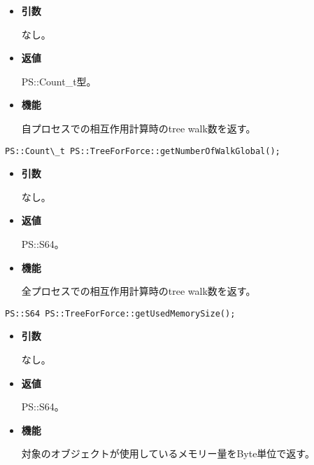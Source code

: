 \begin{itemize}

\item {\bf 引数}

なし。

\item {\bf 返値}

PS::Count\_t型。

\item {\bf 機能}

自プロセスでの相互作用計算時のtree walk数を返す。

\end{itemize}

\begin{screen}
\begin{verbatim}
PS::Count\_t PS::TreeForForce::getNumberOfWalkGlobal();
\end{verbatim}
\end{screen}

\begin{itemize}

\item {\bf 引数}

なし。

\item {\bf 返値}

PS::S64。

\item {\bf 機能}

全プロセスでの相互作用計算時のtree walk数を返す。

\end{itemize}

\begin{screen}
\begin{verbatim}
PS::S64 PS::TreeForForce::getUsedMemorySize();
\end{verbatim}
\end{screen}

\begin{itemize}

\item {\bf 引数}

なし。

\item {\bf 返値}

PS::S64。

\item {\bf 機能}

対象のオブジェクトが使用しているメモリー量をByte単位で返す。

\end{itemize}

